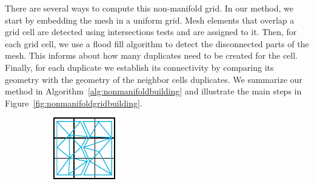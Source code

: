 There are several ways to compute this non-manifold grid. In our method, we start by embedding the mesh in a uniform grid. Mesh elements that overlap a grid cell are detected using intersections tests and are assigned to it. Then, for each grid cell, we use a flood fill algorithm to detect the disconnected parts of the mesh. This informs about how many duplicates need to be created for the cell. Finally, for each duplicate we establish its connectivity by comparing its geometry with the geometry of the neighbor cells duplicates. We summarize our method in Algorithm~\ref{alg:nonmanifoldbuilding} and illustrate the main steps in Figure~\ref{fig:nonmanifoldgridbuilding}.

\begin{figure}[!h]
	\centering
	\begin{subfigure}[b]{0.20\linewidth}
		\centering
		\includegraphics[width=\linewidth]{images/cutting-mig2015/buildNMG_1.pdf}
		\caption{\label{fig:buildNMG1}}
	\end{subfigure}
	\hfill
	\begin{subfigure}[b]{0.20\linewidth}
		\centering

\end{subfigure}
\end{figure}
